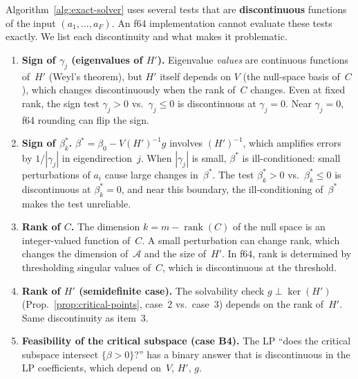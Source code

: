 \begin{remark}%
\label{rem:discontinuities}
Algorithm~\ref{alg:exact-solver} uses several tests that are
\textbf{discontinuous} functions of the input $(a_1, \ldots, a_F)$.
An f64 implementation cannot evaluate these tests exactly.
We list each discontinuity and what makes it problematic.

\begin{enumerate}
  \item \textbf{Sign of $\gamma_j$ (eigenvalues of $H'$).}
    Eigenvalue \emph{values} are continuous functions of~$H'$
    (Weyl's theorem), but $H'$ itself depends on $V$ (the
    null-space basis of~$C$), which changes discontinuously
    when the rank of~$C$ changes.
    Even at fixed rank, the sign test $\gamma_j > 0$ vs.\
    $\gamma_j \leq 0$ is discontinuous at $\gamma_j = 0$.
    Near $\gamma_j = 0$, f64 rounding can flip the sign.

  \item \textbf{Sign of $\beta^*_k$.}
    $\beta^* = \beta_0 - V(H')^{-1} g$ involves $(H')^{-1}$,
    which amplifies errors by $1/|\gamma_j|$ in eigendirection~$j$.
    When $|\gamma_j|$ is small, $\beta^*$ is ill-conditioned:
    small perturbations of $a_i$ cause large changes in~$\beta^*$.
    The test $\beta^*_k > 0$ vs.\ $\beta^*_k \leq 0$ is
    discontinuous at $\beta^*_k = 0$, and near this boundary,
    the ill-conditioning of~$\beta^*$ makes the test unreliable.

  \item \textbf{Rank of $C$.}
    The dimension $k = m - \operatorname{rank}(C)$
    of the null space is an integer-valued function of~$C$.
    A small perturbation can change rank, which changes the
    dimension of~$\mathcal{A}$ and the size of~$H'$.
    In f64, rank is determined by thresholding singular values
    of~$C$, which is discontinuous at the threshold.

  \item \textbf{Rank of $H'$ (semidefinite case).}
    The solvability check $g \perp \ker(H')$
    (Prop.~\ref{prop:critical-points}, case~2 vs.\ case~3)
    depends on the rank of~$H'$.
    Same discontinuity as item~3.

  \item \textbf{Feasibility of the critical subspace (case B4).}
    The LP ``does the critical subspace intersect
    $\{\beta > 0\}$?'' has a binary answer that is discontinuous
    in the LP coefficients, which depend on~$V$, $H'$, $g$.


\end{enumerate}
\end{remark}

